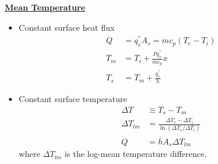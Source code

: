 \textbf{\underline{\large Mean Temperature}}
\begin{itemize}
    \item Constant surface heat flux
    \begin{align*}
        \dot{Q} &= q^{''}_{s}A_s = \dot{m} c_p (T_e - T_i) \\
        T_m &= T_i + \frac{P q_{s}^{''}}{\dot{m}c_p} x \\
        T_s &= T_m + \frac{q_{s}^{''}}{h}
    \end{align*}
    \item Constant surface temperature
    \begin{align*}
        \Delta T &\equiv T_s - T_m \\
        \Delta T_{lm} &= \frac{\Delta T_e - \Delta T_i}{\ln(\Delta T_e / \Delta T_i)} \\
        \dot{Q} &= \overline{h} A_s \Delta T_{lm}
    \end{align*}
    where $\Delta T_{lm}$ is the log-mean temperature difference.
\end{itemize}

